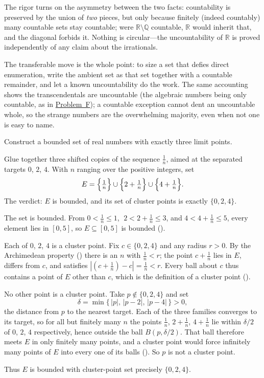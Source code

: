 \documentclass[main.tex]{subfiles}
\begin{document}
\begin{Reflection}
The rigor turns on the asymmetry between the two facts: countability is preserved by the union of
\emph{two} pieces, but only because finitely (indeed countably) many countable sets stay countable;
were $\mathbb R\setminus\mathbb Q$ countable, $\mathbb R$ would inherit that, and the diagonal forbids
it. Nothing is circular---the uncountability of $\mathbb R$ is proved independently of any claim about
the irrationals.

The transferable move is the whole point: to size a set that defies direct enumeration, write the
ambient set as that set together with a countable remainder, and let a known uncountability do the
work. The same accounting shows the transcendentals are uncountable (the algebraic numbers being only
countable, as in \hyperlink{prob:F}{Problem~F}); a countable exception cannot dent an uncountable
whole, so the strange numbers are the overwhelming majority, even when not one is easy to name.
\end{Reflection}

Construct a bounded set of real numbers with exactly three limit points.

\begin{Solution}
Glue together three shifted copies of the sequence $\tfrac1n$, aimed at the separated targets $0$, $2$,
$4$. With $n$ ranging over the positive integers, set
\[
E=\Bigl\{\tfrac1n\Bigr\}\cup\Bigl\{2+\tfrac1n\Bigr\}\cup\Bigl\{4+\tfrac1n\Bigr\}.
\]
The verdict: $E$ is bounded, and its set of cluster points is exactly $\{0,2,4\}$.

The set is bounded. From $0<\tfrac1n\le 1$, $\;2<2+\tfrac1n\le 3$, and $4<4+\tfrac1n\le 5$, every element
lies in $[0,5]$, so $E\subseteq[0,5]$ is bounded ().

Each of $0$, $2$, $4$ is a cluster point. Fix $c\in\{0,2,4\}$ and any radius $r>0$. By the Archimedean
property () there is an $n$ with $\tfrac1n<r$; the point $c+\tfrac1n$ lies
in $E$, differs from $c$, and satisfies $|(c+\tfrac1n)-c|=\tfrac1n<r$. Every ball about $c$ thus contains a
point of $E$ other than $c$, which is the definition of a cluster point ().

No other point is a cluster point. Take $p\notin\{0,2,4\}$ and set
\[
\delta=\min\{\,|p|,\,|p-2|,\,|p-4|\,\}>0,
\]
the distance from $p$ to the nearest target. Each of the three families converges to its target, so for all
but finitely many $n$ the points $\tfrac1n$, $2+\tfrac1n$, $4+\tfrac1n$ lie within $\delta/2$ of $0$, $2$,
$4$ respectively, hence outside the ball $B(p,\delta/2)$. That ball therefore meets $E$ in only finitely
many points, and a cluster point would force infinitely many points of $E$ into every one of its balls
(). So $p$ is not a cluster point.

Thus $E$ is bounded with cluster-point set precisely $\{0,2,4\}$.
\end{Solution}
\end{document}
